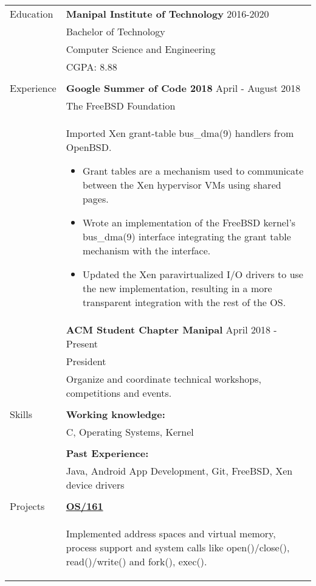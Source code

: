 \documentclass[letterpaper,11pt,oneside]{article}
\begin{document}
\noindent \begin{tabularx}{\textwidth}{l X}
 \Large{Education} & \textbf{Manipal Institute of Technology} \hfill 2016-2020  \\
     & Bachelor of Technology \\
     & Computer Science and Engineering \\
     &  CGPA: 8.88\\
     & \\
 \Large{Experience}    & \textbf{Google Summer of Code 2018} \hfill April - August 2018 \\
    & The FreeBSD Foundation \\
    & Imported Xen grant-table bus\_dma(9) handlers from OpenBSD. \vspace{-1ex}
    \begin{itemize}[label={--}]
    \setlength\itemsep{-0.25em}
        \item Grant tables are a mechanism used to communicate between the Xen hypervisor VMs using shared pages.
        \item Wrote an implementation of the FreeBSD kernel's bus\_dma(9) interface integrating the grant table mechanism with the interface.
        \item Updated the Xen paravirtualized I/O drivers to use the new implementation, resulting in a more transparent integration with the rest of the OS.
    \end{itemize} \\
    & \textbf{ACM Student Chapter Manipal} \hfill April 2018 -  Present \\
    & President \\
    & Organize and coordinate technical workshops, competitions and events. \\
    & \\
 \Large{Skills} & \textbf{Working knowledge:} \\
    & C, Operating Systems, Kernel \\
    & \\
    & \textbf{Past Experience:} \\
    & Java, Android App Development, Git, FreeBSD, Xen device drivers \\
    & \\
 \Large{Projects} \vspace{-1.5ex} & \textbf{\href{https://github.com/prati0100/OS161}{OS/161}} \\
    \vspace{-3ex} & \begin{adjustwidth}{}{}Implemented address spaces and virtual memory, process support and system calls like open()/close(), read()/write() and fork(), exec().\end{adjustwidth} \\

\end{tabularx}
\end{document}
